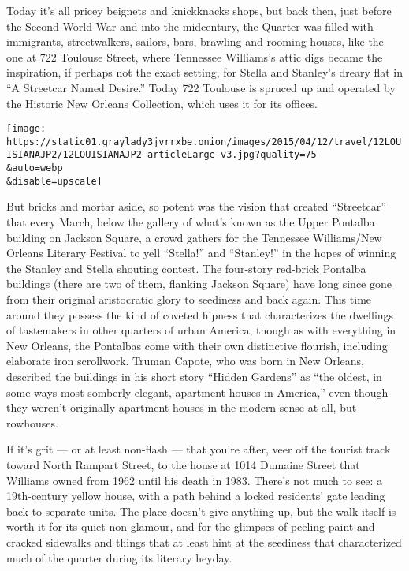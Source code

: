 Today it's all pricey beignets and knickknacks shops, but back then,
just before the Second World War and into the midcentury, the Quarter
was filled with immigrants, streetwalkers, sailors, bars, brawling and
rooming houses, like the one at 722 Toulouse Street, where Tennessee
Williams's attic digs became the inspiration, if perhaps not the exact
setting, for Stella and Stanley's dreary flat in ``A Streetcar Named
Desire.'' Today 722 Toulouse is spruced up and operated by the Historic
New Orleans Collection, which uses it for its offices.

\texttt{[image: https://static01.graylady3jvrrxbe.onion/images/2015/04/12/travel/12LOUISIANAJP2/12LOUISIANAJP2-articleLarge-v3.jpg?quality=75\\\&auto=webp\\\&disable=upscale]}

But bricks and mortar aside, so potent was the vision that created
``Streetcar'' that every March, below the gallery of what's known as the
Upper Pontalba building on Jackson Square, a crowd gathers for the
Tennessee Williams/New Orleans Literary Festival to yell ``Stella!'' and
``Stanley!'' in the hopes of winning the Stanley and Stella shouting
contest. The four-story red-brick Pontalba buildings (there are two of
them, flanking Jackson Square) have long since gone from their original
aristocratic glory to seediness and back again. This time around they
possess the kind of coveted hipness that characterizes the dwellings of
tastemakers in other quarters of urban America, though as with
everything in New Orleans, the Pontalbas come with their own distinctive
flourish, including elaborate iron scrollwork. Truman Capote, who was
born in New Orleans, described the buildings in his short story ``Hidden
Gardens'' as ``the oldest, in some ways most somberly elegant, apartment
houses in America,'' even though they weren't originally apartment
houses in the modern sense at all, but rowhouses.

If it's grit --- or at least non-flash --- that you're after, veer off
the tourist track toward North Rampart Street, to the house at 1014
Dumaine Street that Williams owned from 1962 until his death in 1983.
There's not much to see: a 19th-century yellow house, with a path behind
a locked residents' gate leading back to separate units. The place
doesn't give anything up, but the walk itself is worth it for its quiet
non-glamour, and for the glimpses of peeling paint and cracked sidewalks
and things that at least hint at the seediness that characterized much
of the quarter during its literary heyday.


